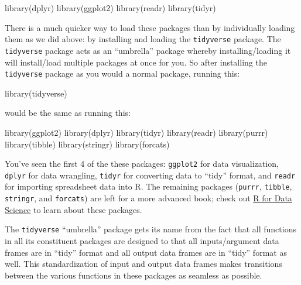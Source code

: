 \documentclass[
  letterpaper,
  DIV=11,
  numbers=noendperiod]{scrreprt}
\newenvironment{Shaded}{\begin{snugshade}}{\end{snugshade}}
\newcommand{\FunctionTok}[1]{\textcolor[rgb]{0.28,0.35,0.67}{#1}}
\newcommand{\NormalTok}[1]{\textcolor[rgb]{0.00,0.23,0.31}{#1}}
\theoremstyle{definition}
\theoremstyle{remark}
\begin{document}
\begin{Shaded}
\begin{Highlighting}[]
\FunctionTok{library}\NormalTok{(dplyr)}
\FunctionTok{library}\NormalTok{(ggplot2)}
\FunctionTok{library}\NormalTok{(readr)}
\FunctionTok{library}\NormalTok{(tidyr)}
\end{Highlighting}
\end{Shaded}

There is a much quicker way to load these packages than by individually
loading them as we did above: by installing and loading the
\texttt{tidyverse} package. The \texttt{tidyverse} package acts as an
``umbrella'' package whereby installing/loading it will install/load
multiple packages at once for you. So after installing the
\texttt{tidyverse} package as you would a normal package, running this:

\begin{Shaded}
\begin{Highlighting}[]
\FunctionTok{library}\NormalTok{(tidyverse)}
\end{Highlighting}
\end{Shaded}

would be the same as running this:

\begin{Shaded}
\begin{Highlighting}[]
\FunctionTok{library}\NormalTok{(ggplot2)}
\FunctionTok{library}\NormalTok{(dplyr)}
\FunctionTok{library}\NormalTok{(tidyr)}
\FunctionTok{library}\NormalTok{(readr)}
\FunctionTok{library}\NormalTok{(purrr)}
\FunctionTok{library}\NormalTok{(tibble)}
\FunctionTok{library}\NormalTok{(stringr)}
\FunctionTok{library}\NormalTok{(forcats)}
\end{Highlighting}
\end{Shaded}

You've seen the first 4 of the these packages: \texttt{ggplot2} for data
visualization, \texttt{dplyr} for data wrangling, \texttt{tidyr} for
converting data to ``tidy'' format, and \texttt{readr} for importing
spreadsheet data into R. The remaining packages (\texttt{purrr},
\texttt{tibble}, \texttt{stringr}, and \texttt{forcats}) are left for a
more advanced book; check out \href{http://r4ds.had.co.nz/}{R for Data
Science} to learn about these packages.

The \texttt{tidyverse} ``umbrella'' package gets its name from the fact
that all functions in all its constituent packages are designed to that
all inputs/argument data frames are in ``tidy'' format and all output
data frames are in ``tidy'' format as well. This standardization of
input and output data frames makes transitions between the various
functions in these packages as seamless as possible.
\end{document}

